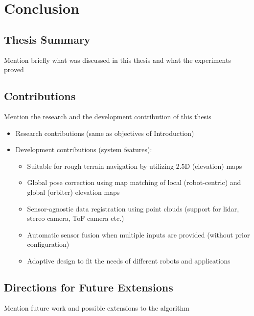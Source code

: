 \label{Chapter5}
\chapter{Conclusion}

\section{Thesis Summary}

Mention briefly what was discussed in this thesis and what the experiments proved

\section{Contributions}

Mention the research and the development contribution of this thesis

\begin{itemize}
    \item Research contributions (same as objectives of Introduction)
    \item Development contributions (system features):
        \begin{itemize}
            \item Suitable for rough terrain navigation by utilizing 2.5D (elevation) maps
            \item Global pose correction using map matching of local (robot-centric) and global (orbiter) elevation maps
            \item Sensor-agnostic data registration using point clouds (support for lidar, stereo camera, ToF camera etc.)
            \item Automatic sensor fusion when multiple inputs are provided (without prior configuration)
            \item Adaptive design to fit the needs of different robots and applications
        \end{itemize}
\end{itemize}

\section{Directions for Future Extensions}

Mention future work and possible extensions to the algorithm

